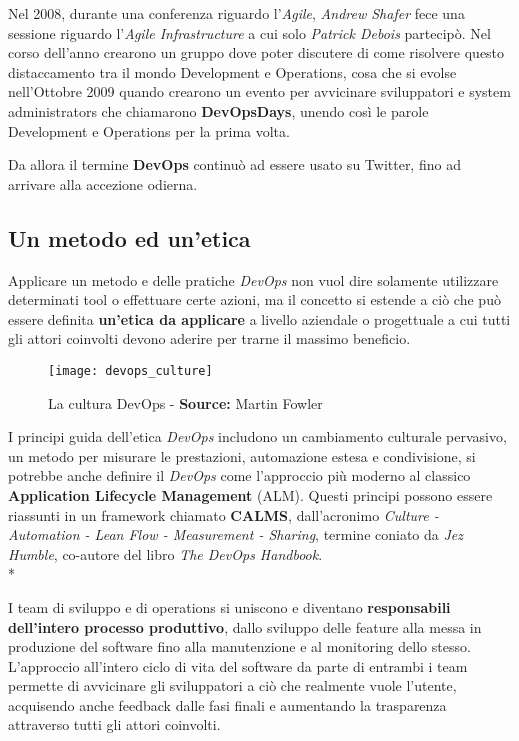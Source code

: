 \documentclass[../main.tex]{subfiles}
\begin{document}
        		Nel 2008, durante una conferenza riguardo l'\emph{Agile}, \emph{Andrew Shafer} fece una sessione riguardo l'\emph{Agile Infrastructure} a cui solo \emph{Patrick Debois} partecipò. Nel corso dell'anno crearono un gruppo dove poter discutere di come risolvere questo distaccamento tra il mondo Development e Operations, cosa che si evolse nell'Ottobre 2009 quando crearono un evento per avvicinare sviluppatori e system administrators che chiamarono \textbf{DevOpsDays}, unendo così le parole Development e Operations per la prima volta.
        		
        		Da allora il termine \textbf{DevOps} continuò ad essere usato su Twitter, fino ad arrivare alla accezione odierna.
        	
        	\subsection{Un metodo ed un'etica}
        	
        		Applicare un metodo e delle pratiche \emph{DevOps} non vuol dire solamente utilizzare determinati tool o effettuare certe azioni, ma il concetto si estende a ciò che può essere definita \textbf{un'etica da applicare} a livello aziendale o progettuale a cui tutti gli attori coinvolti devono aderire per trarne il massimo beneficio.
        		
        		\begin{figure}[h]
        			\centering
        			\texttt{[image: devops\_culture]}
        			\caption{La cultura DevOps - \textbf{Source:} Martin Fowler}
        			\label{fig:devops_culture}
        		\end{figure}
        		
        		I principi guida dell'etica \emph{DevOps} includono un cambiamento culturale pervasivo, un metodo per misurare le prestazioni, automazione estesa e condivisione, si potrebbe anche definire il \emph{DevOps} come l'approccio più moderno al classico \textbf{Application Lifecycle Management} (ALM). Questi principi possono essere riassunti in un framework chiamato \textbf{CALMS}\cite{devops_calms}, dall'acronimo \emph{Culture - Automation - Lean Flow - Measurement - Sharing}, termine coniato da \emph{Jez Humble}, co-autore del libro \emph{The DevOps Handbook}.\\*
        		
        		I team di sviluppo e di operations si uniscono e diventano \textbf{responsabili dell'intero processo produttivo}, dallo sviluppo delle feature alla messa in produzione del software fino alla manutenzione e al monitoring dello stesso. L'approccio all'intero ciclo di vita del software da parte di entrambi i team permette di avvicinare gli sviluppatori a ciò che realmente vuole l'utente, acquisendo anche feedback dalle fasi finali e aumentando la trasparenza attraverso tutti gli attori coinvolti.
        	
\end{document}
